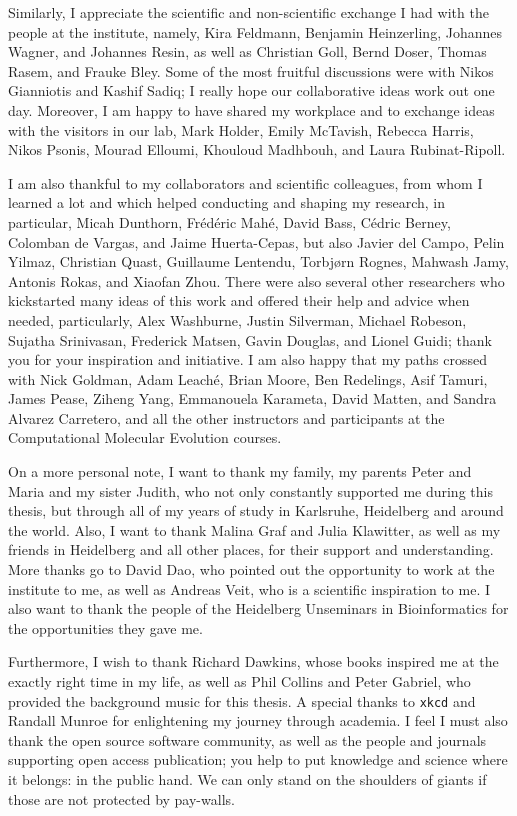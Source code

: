 Similarly, I appreciate the scientific and non-scientific exchange I had with the people at the institute, namely,
Kira Feldmann, Benjamin Heinzerling, Johannes Wagner, and Johannes Resin,
as well as Christian Goll, Bernd Doser, Thomas Rasem, and Frauke Bley.
Some of the most fruitful discussions were with Nikos Gianniotis and Kashif Sadiq;
I really hope our collaborative ideas work out one day.
Moreover, I am happy to have shared my workplace and to exchange ideas with the visitors in our lab,
Mark Holder, Emily McTavish, Rebecca Harris, Nikos Psonis, Mourad Elloumi, Khouloud Madhbouh, and Laura Rubinat-Ripoll.

I am also thankful to my collaborators and scientific colleagues, from whom I learned a lot and which helped
conducting and shaping my research, in particular,
Micah Dunthorn, Fr\'{e}d\'{e}ric Mah\'{e}, David Bass, C\'{e}dric Berney, Colomban de Vargas, and Jaime Huerta-Cepas,
but also Javier del Campo, Pelin Yilmaz, Christian Quast, Guillaume Lentendu, Torbj\o{}rn Rognes, Mahwash Jamy,
Antonis Rokas, and Xiaofan Zhou.
There were also several other researchers who kickstarted many ideas of this work and offered their help and advice when needed,
particularly, Alex Washburne, Justin Silverman, Michael Robeson, Sujatha Srinivasan, Frederick Matsen,
Gavin Douglas, and Lionel Guidi; thank you for your inspiration and initiative.
I am also happy that my paths crossed with Nick Goldman, Adam Leach\'{e}, Brian Moore, Ben Redelings, Asif Tamuri,
James Pease, Ziheng Yang, Emmanouela Karameta, David Matten, and Sandra Alvarez Carretero,
and all the other instructors and participants at the Computational Molecular Evolution courses.

On a more personal note, I want to thank my family, my parents Peter and Maria and my sister Judith,
who not only constantly supported me during this thesis,
but through all of my years of study in Karlsruhe, Heidelberg and around the world.
Also, I want to thank Malina Graf and Julia Klawitter, as well as my friends in Heidelberg and all other places,
for their support and understanding.
More thanks go to David Dao, who pointed out the opportunity to work at the institute to me,
as well as Andreas Veit, who is a scientific inspiration to me.
I also want to thank the people of the Heidelberg Unseminars in Bioinformatics for the opportunities they gave me.

Furthermore, I wish to thank Richard Dawkins, whose books inspired me at the exactly right time in my life,
as well as Phil Collins and Peter Gabriel, who provided the background music for this thesis.
A special thanks to \texttt{xkcd} and Randall Munroe for enlightening my journey through academia.
I feel I must also thank the open source software community,
as well as the people and journals supporting open access publication;
you help to put knowledge and science where it belongs: in the public hand.
We can only stand on the shoulders of giants if those are not protected by pay-walls.


